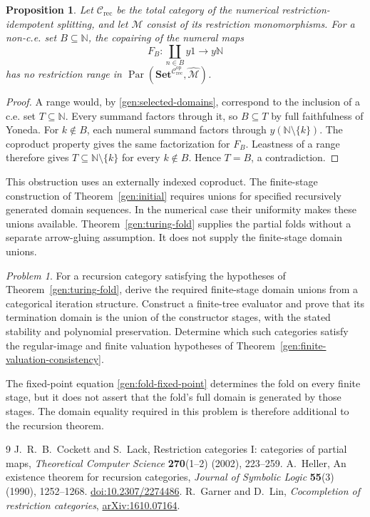 \documentclass[11pt]{article}
\newtheorem{proposition}[theorem]{Proposition}
\theoremstyle{definition}
\theoremstyle{remark}
\newtheorem{problem}[theorem]{Problem}
\newcommand{\N}{\mathbb N}
\newcommand{\Set}{\mathbf{Set}}
\newcommand{\op}{\mathrm{op}}
\begin{document}
\begin{proposition}\label{gen:no-presheaf-range}
Let $\mathscr C_{\mathrm{rec}}$ be the total category of the numerical
restriction-idempotent splitting, and let $\mathcal M$ consist of its
restriction monomorphisms. For a non-c.e. set $B\subseteq\N$, the
copairing of the numeral maps
\[
 F_B:\coprod_{n\in B}y1\longrightarrow y\N
\]
has no restriction range in
$\operatorname{Par}(\Set^{\mathscr C_{\mathrm{rec}}^{\op}},
\widehat{\mathcal M})$.
\end{proposition}
\begin{proof}
A range would, by \eqref{gen:selected-domains}, correspond to the
inclusion of a c.e. set $T\subseteq\N$. Every summand factors through
it, so $B\subseteq T$ by full faithfulness of Yoneda. For $k\notin B$,
each numeral summand factors through $y(\N\setminus\{k\})$. The
coproduct property gives the same factorization for $F_B$. Leastness of
a range therefore gives $T\subseteq\N\setminus\{k\}$ for every
$k\notin B$. Hence $T=B$, a contradiction.
\end{proof}

This obstruction uses an externally indexed coproduct. The finite-stage
construction of Theorem~\ref{gen:initial} requires unions for specified
recursively generated domain sequences. In the numerical case their
uniformity makes these unions available. Theorem~\ref{gen:turing-fold}
supplies the partial folds without a separate arrow-gluing assumption.
It does not supply the finite-stage domain unions.

\begin{problem}\label{gen:next-problem}
For a recursion category satisfying the hypotheses of
Theorem~\ref{gen:turing-fold}, derive the required finite-stage domain
unions from a categorical iteration structure. Construct a finite-tree
evaluator and prove that its termination domain is the union of the
constructor stages, with the stated stability and polynomial preservation.
Determine which such categories satisfy the regular-image and finite
valuation hypotheses of Theorem~\ref{gen:finite-valuation-consistency}.
\end{problem}

The fixed-point equation \eqref{gen:fold-fixed-point} determines the
fold on every finite stage, but it does not assert that the fold's full
domain is generated by those stages. The domain equality required in
this problem is therefore additional to the recursion theorem.

\begin{thebibliography}{9}
 J.~R.~B.~Cockett and S.~Lack,
Restriction categories I: categories of partial maps,
\emph{Theoretical Computer Science} \textbf{270}(1--2) (2002), 223--259.
 A.~Heller,
An existence theorem for recursion categories,
\emph{Journal of Symbolic Logic} \textbf{55}(3) (1990), 1252--1268.
\href{https://doi.org/10.2307/2274486}{doi:10.2307/2274486}.
 R.~Garner and D.~Lin,
\emph{Cocompletion of restriction categories},
\href{https://arxiv.org/abs/1610.07164}{arXiv:1610.07164}.
\end{thebibliography}
\end{document}
